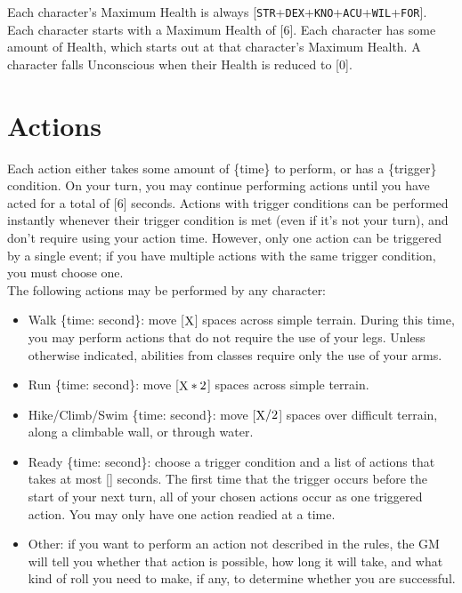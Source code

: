 \documentclass[12pt]{article}
\newcommand{\STR}{\texttt{STR}}
\newcommand{\DEX}{\texttt{DEX}}
\newcommand{\KNO}{\texttt{KNO}}
\newcommand{\ACU}{\texttt{ACU}}
\newcommand{\WIL}{\texttt{WIL}}
\newcommand{\FOR}{\texttt{FOR}}
\newcommand{\X}{\text{{\lower 0.2mm \hbox{X}}}}
\newcommand{\TIME}[1]{\{time: #1 second\if1#1{}\else{s}\fi\}}
\begin{document}
Each character's Maximum Health is always [\STR+\DEX+\KNO+\ACU+\WIL+\FOR]. Each character starts with a Maximum Health of [6].
Each character has some amount of Health, which starts out at that character's Maximum Health. A character falls Unconscious when their Health is reduced to [0].

\pagebreak
\section{Actions}

Each action either takes some amount of \{time\} to perform, or has a \{trigger\} condition. On your turn, you may continue performing actions until you have acted for a total of [6] seconds. Actions with trigger conditions can be performed instantly whenever their trigger condition is met (even if it’s not your turn), and don’t require using your action time. However, only one action can be triggered by a single event; if you have multiple actions with the same trigger condition, you must choose one.
\\[5mm]
The following actions may be performed by any character:
\begin{itemize}

\item Walk \TIME{\X}: move [$\X$] spaces across simple terrain. During this time, you may perform actions that do not require the use of your legs. Unless otherwise indicated, abilities from classes require only the use of your arms.

\item Run \TIME{\X}: move [$\X * 2$] spaces across simple terrain.

\item Hike/Climb/Swim \TIME{\X}: move [$\X / 2$] spaces over difficult terrain, along a climbable wall, or through water.

\item Ready \TIME{\X}: choose a trigger condition and a list of actions that takes at most [\X] seconds. The first time that the trigger occurs before the start of your next turn, all of your chosen actions occur as one triggered action. You may only have one action readied at a time.

\item Other: if you want to perform an action not described in the rules, the GM will tell you whether that action is possible, how long it will take, and what kind of roll you need to make, if any, to determine whether you are successful.

\end{itemize}
\end{document}
